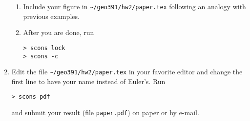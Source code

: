 \begin{enumerate}
\begin{enumerate}


\item Include your figure in \verb#~/geo391/hw2/paper.tex# following an analogy with previous examples.
  
\item After you are done, run
\begin{verbatim}
> scons lock
> scons -c
\end{verbatim}

\end{enumerate}

\item Edit the file
\verb#~/geo391/hw2/paper.tex# in your favorite editor and change the
first line to have your name instead of Euler's. Run
\begin{verbatim}
> scons pdf
\end{verbatim}
and submit your result (file \texttt{paper.pdf}) on paper or by
e-mail.

\end{enumerate}
